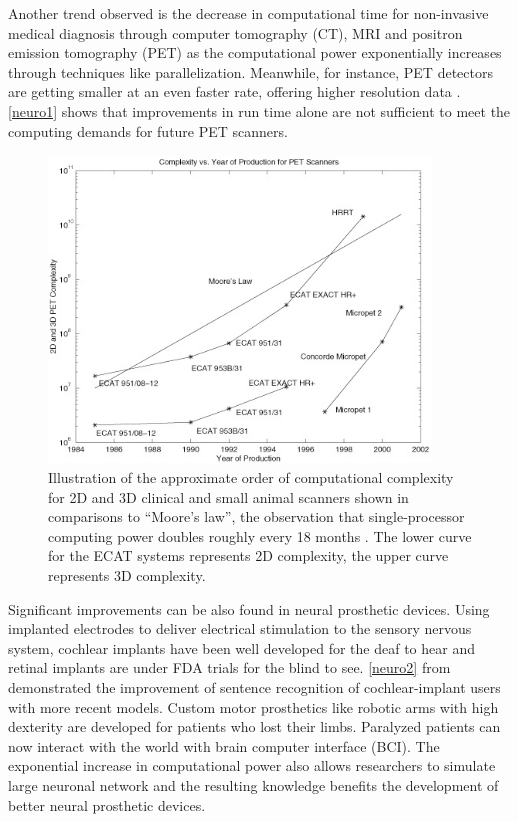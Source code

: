 \documentclass[letter,11pt]{article}
\begin{document}
Another trend observed is the decrease in computational time for non-invasive
medical diagnosis through computer tomography (CT), MRI and positron emission
tomography (PET) as the computational power exponentially increases through
techniques like parallelization. Meanwhile, for instance, PET detectors are
getting smaller at an even faster rate, offering higher resolution data
\cite{neuroimage2004}.  \autoref{neuro1} shows that improvements in run time
alone are not sufficient to meet the computing demands for future PET scanners. 

\begin{figure}[htbp]
\centering
\includegraphics[width=4in]{neuro1.png}
\caption{Illustration of the approximate order of computational complexity for
2D and 3D clinical and small animal scanners shown in comparisons to ``Moore's
law'', the observation that single-processor computing power doubles roughly
every 18 months \cite{neuroimage2004}. The lower curve for the ECAT systems
represents 2D complexity, the upper curve represents 3D complexity.}
\label{neuro1}
\end{figure}
 
Significant improvements can be also found in neural prosthetic devices. Using
implanted electrodes to deliver electrical stimulation to the sensory nervous
system, cochlear implants have been well developed for the deaf to hear and
retinal implants are under FDA trials for the blind to see. \autoref{neuro2}
from \cite{Zeng2004} demonstrated the improvement of sentence recognition of
cochlear-implant users with more recent models. Custom motor prosthetics like
robotic arms with high dexterity are developed for patients who lost their
limbs. Paralyzed patients can now interact with the world with brain computer
interface (BCI). The exponential increase in computational power also allows
researchers to simulate large neuronal network and the resulting knowledge
benefits the development of better neural prosthetic devices.
 
\end{document}
